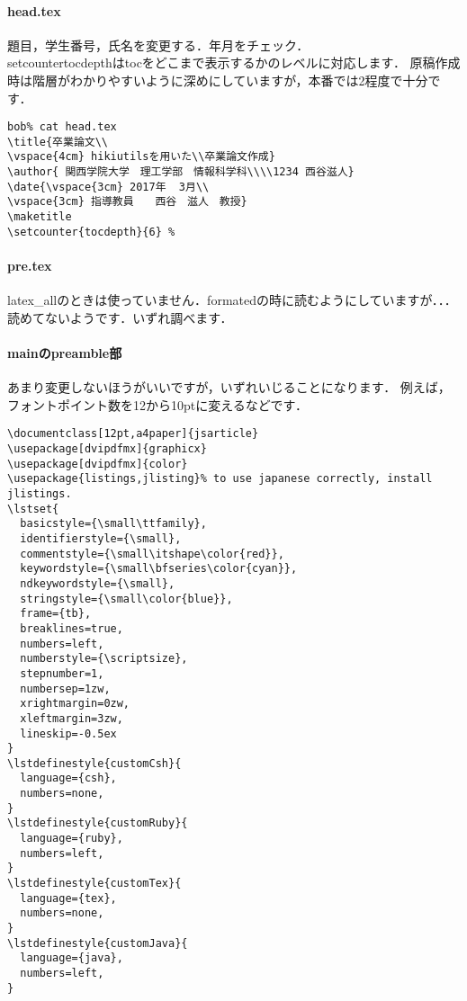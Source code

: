 \paragraph{head.tex}
題目，学生番号，氏名を変更する．年月をチェック．
\\setcounter{tocdepth}はtocをどこまで表示するかのレベルに対応します．
原稿作成時は階層がわかりやすいように深めにしていますが，本番では2程度で十分です．
\begin{lstlisting}[style=customTeX,basicstyle={\scriptsize\ttfamily}]
bob% cat head.tex
\title{卒業論文\\
\vspace{4cm} hikiutilsを用いた\\卒業論文作成}
\author{ 関西学院大学　理工学部　情報科学科\\\\1234 西谷滋人}
\date{\vspace{3cm} 2017年  3月\\
\vspace{3cm} 指導教員　　西谷　滋人　教授}
\maketitle
\setcounter{tocdepth}{6} %

\end{lstlisting}
\paragraph{pre.tex}
latex\_allのときは使っていません．formatedの時に読むようにしていますが．．．読めてないようです．いずれ調べます．

\paragraph{mainのpreamble部}
あまり変更しないほうがいいですが，いずれいじることになります．
例えば，フォントポイント数を12から10ptに変えるなどです．
\begin{lstlisting}[style=customTeX,basicstyle={\scriptsize\ttfamily}]
\documentclass[12pt,a4paper]{jsarticle}
\usepackage[dvipdfmx]{graphicx}
\usepackage[dvipdfmx]{color}
\usepackage{listings,jlisting}% to use japanese correctly, install jlistings.
\lstset{
  basicstyle={\small\ttfamily},
  identifierstyle={\small},
  commentstyle={\small\itshape\color{red}},
  keywordstyle={\small\bfseries\color{cyan}},
  ndkeywordstyle={\small},
  stringstyle={\small\color{blue}},
  frame={tb},
  breaklines=true,
  numbers=left,
  numberstyle={\scriptsize},
  stepnumber=1,
  numbersep=1zw,
  xrightmargin=0zw,
  xleftmargin=3zw,
  lineskip=-0.5ex
}
\lstdefinestyle{customCsh}{
  language={csh},
  numbers=none,
}
\lstdefinestyle{customRuby}{
  language={ruby},
  numbers=left,
}
\lstdefinestyle{customTex}{
  language={tex},
  numbers=none,
}
\lstdefinestyle{customJava}{
  language={java},
  numbers=left,
}

\end{lstlisting}
